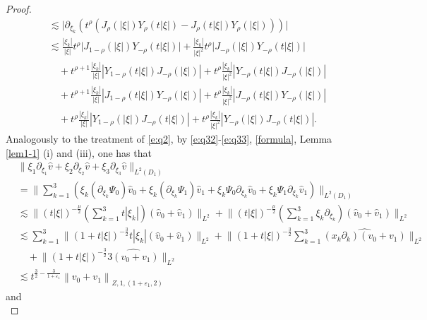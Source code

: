 \documentclass[10pt,a4paper]{amsart}
\newcommand{\f}{\frac}
\newcommand{\p}{\partial}
\begin{document}
\begin{proof}
\begin{equation}
\begin{aligned}
& \lesssim  \big| \partial_{\xi_k} \left( t^\rho \left( J_{\rho}(|\xi|) Y_\rho(t|\xi|)
- J_\rho(t|\xi|) Y_{\rho}(|\xi|) \right) \right) \big| \\
& \lesssim  \frac{|\xi_k|}{|\xi|} t^\rho \big| J_{1-\rho}(|\xi|) Y_{-\rho}(t|\xi|) \big|
+ \frac{|\xi_k|}{|\xi|^2} t^\rho \big| J_{-\rho}(|\xi|) Y_{-\rho}(t|\xi|) \big| \\
& \quad + t^{\rho+1}\f{|\xi_k|}{|\xi|} \left| Y_{1-\rho}(t|\xi|)J_{-\rho}(|\xi|) \right|
+ t^\rho \frac{|\xi_k|}{|\xi|^2} \left| Y_{-\rho}(t|\xi|)J_{-\rho}(|\xi|) \right|\\
& \quad + t^{\rho+1}\f{|\xi_k|}{|\xi|} \left| J_{1-\rho}(t|\xi|) Y_{-\rho}(|\xi|) \right|
+ t^\rho \frac{|\xi_k|}{|\xi|^2} \left| J_{-\rho}(t|\xi|) Y_{-\rho}(|\xi|) \right| \\
& \quad + t^\rho \f{|\xi_k|}{|\xi|} \left| Y_{1-\rho}(|\xi|) J_{-\rho}(t|\xi|) \right|
+ t^\rho \frac{|\xi_k|}{|\xi|^2} \left| Y_{-\rho}(|\xi|) J_{-\rho}(t|\xi|) \right|.
\end{aligned}
\end{equation}
Analogously to the treatment of \eqref{e:q2}, by \eqref{e:q32}-\eqref{e:q33}, \eqref{formula},  Lemma \ref{lem1-1} (i) and (iii),
one has that
\begin{equation}\label{e:q34}
\begin{aligned}
&\big\|\xi_1\p_{\xi_1}\hat{v}+\xi_2\p_{\xi_2}\hat{v}+\xi_3\p_{\xi_3}\hat{v}\big\|_{L^2(D_1)}\\
&=\big\|  \sum_{k=1}^{3}\left( \xi_k (\partial_{\xi_k} \Psi_0) \hat{v}_0
+ \xi_k (\partial_{\xi_k} \Psi_1) \hat{v}_1
+ \xi_k \Psi_0 \partial_{\xi_k} \hat{v}_0
+ \xi_k \Psi_1 \partial_{\xi_k} \hat{v}_1\right)\big\|_{L^2(D_1)}\\
&\lesssim \big\|(t|\xi|)^{-\frac{\mu}{2}}(\sum_{k=1}^3t|\xi_k|)(\hat{v}_{0}+\hat{v}_{1})\big\|_{L^{2}}+ \big\|(t|\xi|)^{-\f{\mu}{2}}(\sum_{k=1}^3\xi_k\p_{\xi_k})(\hat{v}_{0}+\hat{v}_{1})\big\|_{L^{2}}\\
& \lesssim \sum_{k=1}^3 \big\|(1+t|\xi|)^{-\f{3}{2}}t|\xi_k|(\hat{v}_{0}+\hat{v}_{1})\big\|_{L^{2}}+
\big\|(1+t|\xi|)^{-\f{3}{2}}\sum_{k=1}^3\widehat{(x_k\p_k)(v_0+v_1)}\big\|_{L^{2}}\\
&\quad+ \big\|(1+t|\xi|)^{-\f{3}{2}}\widehat{3(v_0+v_1)}\big\|_{L^{2}}\\
&\lesssim  t^{\f32-\f{3}{1+\varepsilon_1}}\left\|v_0+v_1\right\|_{Z, 1,(1+\varepsilon_1, 2)}
\end{aligned}
\end{equation}
and
\begin{equation}\label{e:q35}

\end{equation}
\end{proof}
\end{document}

